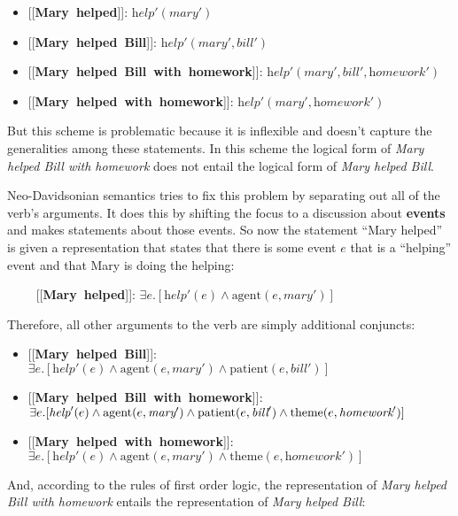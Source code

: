 \documentclass[11pt,letterpaper]{article}
\newcommand{\sem}[1]{\mbox{[\hspace{-1.25px}[{\bf #1}]\hspace{-1.5px}]}}
\begin{document}
\begin{itemize}
  \item[] \sem{Mary helped}: $\textit{help}'(\textit{mary}')$
  \item[] \sem{Mary helped Bill}: $\textit{help}'(\textit{mary}', \textit{bill}')$
  \item[] \sem{Mary helped Bill with homework}: $\textit{help}'(\textit{mary}', \textit{bill}', \textit{homework}')$
  \item[] \sem{Mary helped with homework}: $\textit{help}'(\textit{mary}', \textit{homework}')$
\end{itemize}

But this scheme is problematic because it is inflexible and doesn't capture the generalities among these statements.  In this scheme the logical form of \textit{Mary helped Bill with homework} does not entail the logical form of \textit{Mary helped Bill}.

Neo-Davidsonian semantics tries to fix this problem by separating out all of the verb's arguments.  It does this by shifting the focus to a discussion about \textbf{events} and makes statements about those events.  So now the statement ``Mary helped'' is given a representation that states that there is some event $e$ that is a ``helping'' event and that Mary is doing the helping:

~~~~ \sem{Mary helped}: $\exists e.[\textit{help}'(e) \land \text{agent}(e, \textit{mary}')]$

Therefore, all other arguments to the verb are simply additional conjuncts:

\begin{itemize}
  \item[] \sem{Mary helped Bill}: $\exists e.[\textit{help}'(e) \land \text{agent}(e, \textit{mary}') \land \text{patient}(e, \textit{bill}')]$
  \item[] \sem{Mary helped Bill with homework}: $\exists e.[\textit{help}'(e) \land \text{agent}(e, \textit{mary}') \land \text{patient}(e, \textit{bill}') \land \\ \text{theme}(e, \textit{homework}')]$
  \item[] \sem{Mary helped with homework}: $\exists e.[\textit{help}'(e) \land \text{agent}(e, \textit{mary}') \land \text{theme}(e, \textit{homework}')]$
\end{itemize}

And, according to the rules of first order logic, the representation of \textit{Mary helped Bill with homework} entails the representation of \textit{Mary helped Bill}:
\end{document}
